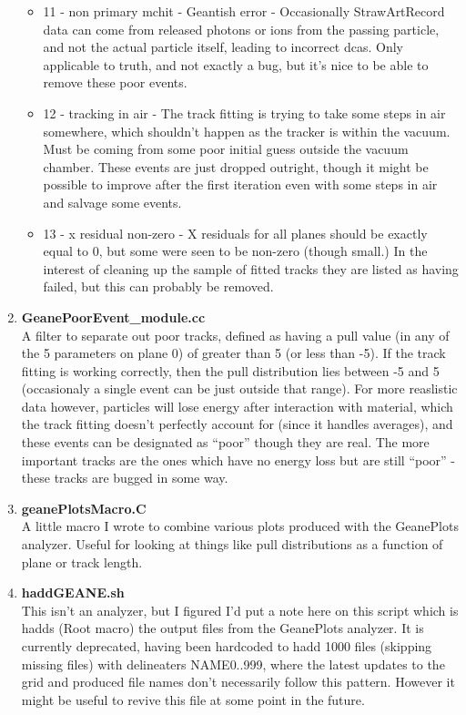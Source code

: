\begin{enumerate}
\begin{itemize}
          \item{11 - non primary mchit} - Geantish error - Occasionally StrawArtRecord data can come from released photons or ions from the passing particle, and not the actual particle itself, leading to incorrect dcas. Only applicable to truth, and not exactly a bug, but it's nice to be able to remove these poor events.
          \item{12 - tracking in air} - The track fitting is trying to take some steps in air somewhere, which shouldn't happen as the tracker is within the vacuum. Must be coming from some poor initial guess outside the vacuum chamber. These events are just dropped outright, though it might be possible to improve after the first iteration even with some steps in air and salvage some events.
          \item{13 - x residual non-zero} - X residuals for all planes should be exactly equal to 0, but some were seen to be non-zero (though small.) In the interest of cleaning up the sample of fitted tracks they are listed as having failed, but this can probably be removed. 

        \end{itemize}

      \item{\bf{GeanePoorEvent\_module.cc}} \\
      A filter to separate out poor tracks, defined as having a pull value (in any of the 5 parameters on plane 0) of greater than 5 (or less than -5). If the track fitting is working correctly, then the pull distribution lies between -5 and 5 (occasionaly a single event can be just outside that range). For more reaslistic data however, particles will lose energy after interaction with material, which the track fitting doesn't perfectly account for (since it handles averages), and these events can be designated as ``poor'' though they are real. The more important tracks are the ones which have no energy loss but are still ``poor'' - these tracks are bugged in some way.

      \item{\bf{geanePlotsMacro.C}} \\
      A little macro I wrote to combine various plots produced with the GeanePlots analyzer. Useful for looking at things like pull distributions as a function of plane or track length.

      \item{\bf{haddGEANE.sh}} \\
      This isn't an analyzer, but I figured I'd put a note here on this script which is hadds (Root macro) the output files from the GeanePlots analyzer. It is currently deprecated, having been hardcoded to hadd 1000 files (skipping missing files) with delineaters {NAME}{0..999}, where the latest updates to the grid and produced file names don't necessarily follow this pattern. However it might be useful to revive this file at some point in the future.

    \end{enumerate}


